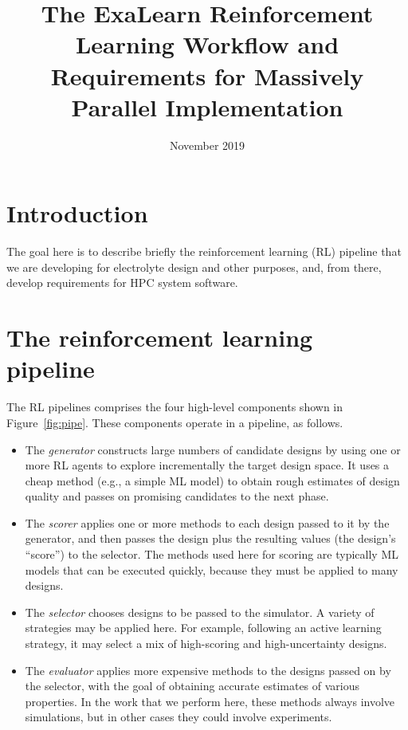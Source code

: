 \documentclass[10pt]{article}
\title{The ExaLearn Reinforcement Learning Workflow and Requirements for Massively Parallel Implementation}
\author{}
\date{November 2019}
\begin{document}
\maketitle

\tableofcontents

\section{Introduction}

The goal here is to describe briefly the reinforcement learning (RL) pipeline that we are developing for electrolyte design and other purposes,
and, from there, develop requirements for HPC system software.


\section{The reinforcement learning pipeline}\label{sec:overview} 


The RL pipelines comprises the four high-level components shown in Figure~\ref{fig:pipe}. These components operate in a pipeline, as follows.

\begin{itemize}
\itemsep-0.2em 
\item
The \emph{generator} constructs large numbers of candidate designs by using one or more RL agents to explore incrementally the target design space.
It uses a cheap method (e.g., a simple ML model) to obtain rough estimates of design quality and passes on promising candidates to the next phase.

\item
The \emph{scorer} applies one or more methods to each design passed to it by the generator, 
and then passes the design plus the resulting values (the design's ``score'') to the selector. 
The methods used here for scoring are typically ML models that can be executed quickly, because they must be applied to many designs.

\item
The \emph{selector} chooses designs to be passed to the simulator.
A variety of strategies may be applied here. 
For example, following an active learning strategy, it may select a mix of high-scoring and high-uncertainty designs.

\item
The \emph{evaluator} applies more expensive methods to the designs passed on by the selector, 
with the goal of obtaining accurate estimates of various properties. 
In the work that we perform here, these methods always involve simulations, but in other cases they could involve experiments.

\end{itemize}
\end{document}
